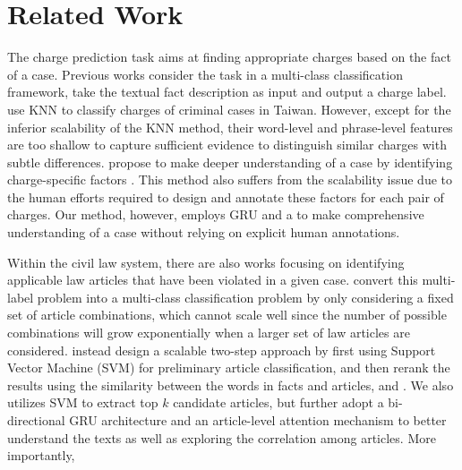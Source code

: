 \section{Related Work}
\label{sec_related_work}
The charge prediction task aims at finding appropriate charges based on the fact of a case. Previous works consider the task in a multi-class classification framework, take the textual fact description as input and output a charge label. 
\cite{LIU2004case,liu2006exploring} use KNN to classify charges of criminal cases in Taiwan. However, except for the inferior scalability of the KNN method, their word-level and phrase-level features are too shallow to capture  sufficient evidence to distinguish similar charges with subtle differences. 
\cite{lin2012exploiting} propose to make deeper understanding of a case by identifying charge-specific factors . This method also suffers from the scalability issue due to the human efforts required to design and annotate these factors for each pair of charges. Our method, however, employs GRU and a  to make comprehensive understanding of a case without relying on explicit human annotations. 

Within the civil law system,
there are also works focusing on identifying applicable law articles that have been  violated in a given case. 
\cite{liu2005classifying,liu2006exploring} convert this multi-label problem into a multi-class classification problem by only considering a fixed set of article combinations, which cannot scale well since the number of possible combinations will grow exponentially when a larger set of law articles are considered.
\cite{liu2015predicting} instead design a scalable two-step approach %
by first using Support Vector Machine (SVM) for preliminary article classification, and then 
rerank the results using the similarity between the words in facts and articles, and .
We also utilizes SVM to extract top $k$ candidate articles, but further adopt a bi-directional GRU architecture and an article-level attention mechanism to better understand the texts as well as exploring the correlation among articles. 
More importantly, 

